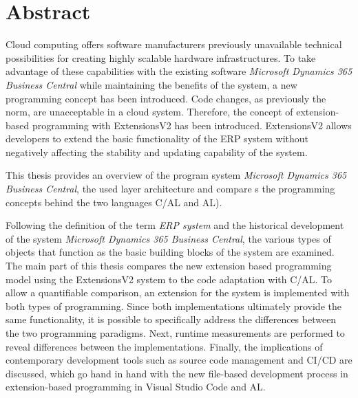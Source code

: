 \chapter*{Abstract}

Cloud computing offers software manufacturers previously unavailable technical possibilities for creating highly scalable hardware infrastructures. To take advantage of these capabilities with the existing software \textit{Microsoft Dynamics 365 Business Central} while maintaining the benefits of the system, a new programming concept has been introduced. Code changes, as previously the norm, are unacceptable in a cloud system. Therefore, the concept of extension-based programming with ExtensionsV2 has been introduced. ExtensionsV2 allows developers to extend the basic functionality of the ERP system without negatively affecting the stability and updating capability of the system.


This thesis provides an overview of the program system \textit {Microsoft Dynamics 365 Business Central}, the used layer architecture and compare s the programming concepts behind the two languages C/AL and AL).


Following the definition of the term \textit{ERP system} and the historical development of the system \textit{Microsoft Dynamics 365 Business Central}, the various types of objects that function as the basic building blocks of the system are examined. The main part of this thesis compares the new extension based programming model using the ExtensionsV2 system to the code adaptation with C/AL. To allow a quantifiable comparison, an extension for the system is implemented with both types of programming. Since both implementations ultimately provide the same functionality, it is possible to specifically address the differences between the two programming paradigms. Next, runtime measurements are performed to reveal differences between the implementations. Finally, the implications of contemporary development tools such as source code management and CI/CD are discussed, which go hand in hand with the new file-based development process in extension-based programming in Visual Studio Code and AL.